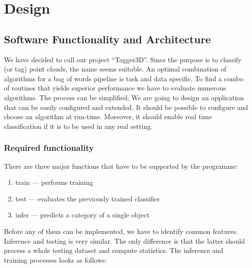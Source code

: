 \chapter{Design}

\section{Software Functionality and Architecture}
	
	We have decided to call our project ``Tagger3D''.  Since the purpose is to classify (or tag) point clouds, the name seems suitable. An optimal combination of algorithms for a bag of words pipeline is task and data specific. To find a combo of routines that yields superior performance we have to evaluate numerous algorithms. The process can be simplified; We are going to design an application that can be easily configured and extended. It should be possible to configure and choose an algorithm at run-time. Moreover, it should enable real time classification if it is to be used in any real setting.
	
	\subsection{Required functionality}	
	There are three major functions that have to be supported by the programme:
	\begin{enumerate}
	 \item train --- performs training
	 \item test --- evaluates the previously trained classifier
	 \item infer --- predicts a category of a single object
	\end{enumerate}
	
	Before any of them can be implemented, we have to identify common features. Inference and testing is very similar. The only difference is that the latter should process a whole testing dataset and compute statistics. The inference and training processes looks as follows:
	
